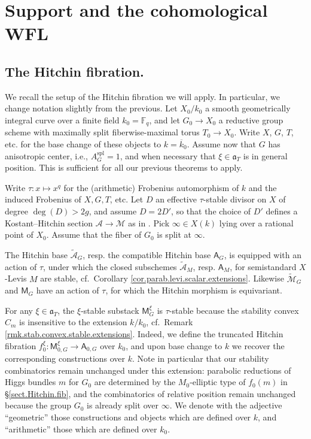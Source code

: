 \documentclass[openany]{amsbook}
\theoremstyle{definition}
\theoremstyle{remark}
\numberwithin{equation}{section}
\newcommand{\F}{\mathbb{F}}
\newcommand{\cA}{\mathcal{A}}
\newcommand{\cM}{\mathcal{M}}
\newcommand{\ol}[1]{\overline{#1}}
\renewcommand{\-}{\operatorname{-}}
\renewcommand{\a}{\mathfrak{a}}
\newcommand{\ctM}{\widetilde{\cM}}
\newcommand{\ctA}{\widetilde{\cA}}
\newcommand{\bM}{\mathsf{M}}
\newcommand{\bA}{\mathsf{A}}
\newcommand{\spl}{\mathrm{spl}}
\begin{document}
        
        

        







\chapter{Support and the cohomological WFL}\label{sect.coh.thms}


\section{The Hitchin fibration.}

We recall the setup of the Hitchin fibration we will apply. In particular, we change notation slightly from the previous. Let $X_0/k_0$ a smooth geometrically integral curve over a finite field $k_0 = \F_q$, and let $G_0 \to X_0$ a reductive group scheme with maximally split fiberwise-maximal torus $T_0 \to X_0$. Write $X$, $G$, $T$, etc. for the base change of these objects to $k = \ol{k}_0$. Assume now that $G$ has anisotropic center, i.e., $A_G^{\spl} = 1$, and when necessary that $\xi 
\in \a_T$ is in general position. This is sufficient for all our previous theorems to apply. 

Write $\tau : x \mapsto x^q$ for the (arithmetic) Frobenius automorphism of $k$ and the induced Frobenius of $X, G, T$, etc. Let $D$ an effective $\tau$-stable divisor on $X$ of degree $\deg(D) > 2g$, and assume $D = 2 D'$, so that the choice of $D'$ defines a Kostant--Hitchin section $\cA \to \cM$ as in \cite[\S 4.3.3]{bouthierprodform}. Pick $\infty \in X(k)$ lying over a rational point of $X_0$. Assume that the fiber of $G_0$ is split at $\infty$.

The Hitchin base $\ctA_G$, resp. the compatible Hitchin base $\bA_G$, is equipped with an action of $\tau$, under which the closed subschemes $\ctA_M$, resp. $\bA_M$, for semistandard $X$-Levis $M$ are stable, cf.\ Corollary \ref{cor.parab.levi.scalar.extensions}. Likewise $\ctM_G$ and $\bM_G$ have an action of $\tau$, for which the Hitchin morphism is equivariant. 

For any $\xi \in \a_T$, the $\xi$-stable substack $\bM_G^\xi$ is $\tau$-stable because the stability convex $C_m$ is insensitive to the extension $k/k_0$, cf.\ Remark \ref{rmk.stab.convex.stable.extensions}. Indeed, we define the truncated Hitchin fibration $f_0^{\xi} : \bM_{0, G}^{\xi} \to \bA_{0, G}$ over $k_0$, and upon base change to $k$ we recover the corresponding constructions over $k$. Note in particular that our stability combinatorics remain unchanged under this extension: parabolic reductions of Higgs bundles $m$ for $G_0$ are determined by the $M_0$-elliptic type of $f_0(m)$ in \S \ref{sect.Hitchin.fib}, and the combinatorics of relative position remain unchanged because the group $G_0$ is already split over $\infty$. We denote with the adjective ``geometric'' those constructions and objects which are defined over $k$, and ``arithmetic'' those which are defined over $k_0$. 
\end{document}
